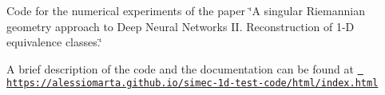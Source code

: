 Code for the numerical experiments of the paper \char`\"{}\+A singular Riemannian geometry approach to Deep Neural Networks I\+I. Reconstruction of 1-\/\+D equivalence classes.\char`\"{}

A brief description of the code and the documentation can be found at \href{https://alessiomarta.github.io/simec-1d-test-code/html/index.html}{\texttt{ https\+://alessiomarta.\+github.\+io/simec-\/1d-\/test-\/code/html/index.\+html}} 